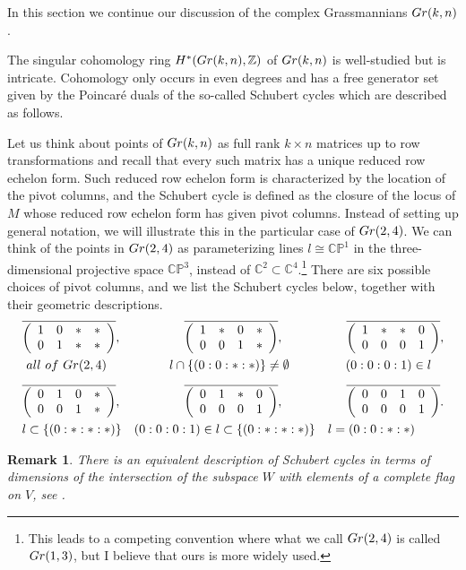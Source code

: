 \documentclass[11pt]{article}
\numberwithin{equation}{section}
\numberwithin{footnote}{section}
\newtheorem{rem}[thm]{Remark}
\newcommand{\Gr}{{\rm Gr}}
\renewcommand{\P}{{\mathbb P}}
\newcommand{\Z}{{\mathbb Z}}
\newcommand{\C}{{\mathbb C}}
\begin{document}
In this section we  continue our discussion of the complex Grassmannians $\Gr(k,n)$. 

\smallskip
The singular cohomology ring $H^*(\Gr(k,n),\Z)$ of $\Gr(k,n)$ is well-studied but is intricate. 
Cohomology only occurs in even degrees and has a free generator set given by the Poincar\'e duals of the so-called Schubert cycles which are described as follows.

\smallskip
Let us think about points of  $\Gr(k,n)$  as full rank $k\times n$ matrices up to row transformations and recall that every such matrix has a unique reduced row echelon form. Such reduced row echelon form is characterized by the location of the pivot columns, and the Schubert cycle is defined as the closure of the locus of $M$ whose reduced row echelon form has given pivot columns. Instead of setting up general notation, we will illustrate this in the particular case of $\Gr(2,4)$. We can think of the points in $\Gr(2,4)$ as parameterizing lines $l\cong\C\P^1$ in the three-dimensional projective space $\C\P^3$, instead of $\C^2\subset \C^4$.\footnote{ This leads to a competing convention where what we call $\Gr(2,4)$ is called $\Gr(1,3)$, but I believe that ours is more widely used.}
There are six possible choices of pivot columns, and we list the Schubert cycles below, together with their geometric descriptions. 
\begin{align}\label{sch}
&
\overline{\left(
\begin{array}{cccc}
1&0&*&*\\
0&1&*&*
\end{array}
\right)},
\hskip 50pt
\overline{\left(
\begin{array}{cccc}
1&*&0&*\\
0&0&1&*
\end{array}
\right)},
\hskip 50pt
\overline{\left(
\begin{array}{cccc}
1&*&*&0\\
0&0&0&1
\end{array}
\right)},
\notag\\
&
{\rm ~all~of~}\Gr(2,4)
\hskip 50pt
l\cap \{(0:0:*:*)\}\neq \emptyset
\hskip 45pt
(0:0:0:1)\in l
\notag
\\[.5em]
&
\overline{\left(
\begin{array}{cccc}
0&1&0&*\\
0&0&1&*
\end{array}
\right)},
\hskip 50pt
\overline{\left(
\begin{array}{cccc}
0&1&*&0\\
0&0&0&1
\end{array}
\right)},
\hskip 50pt
\overline{\left(
\begin{array}{cccc}
0&0&1&0\\
0&0&0&1
\end{array}
\right)}.
\notag\\
&
l\subset\{(0:*:*:*)\}
\hskip 10pt
(0:0:0:1)\in l\subset \{(0:*:*:*)\}
\hskip 10pt
l=(0:0:*:*)
\end{align}
\begin{rem}
There is an equivalent description of Schubert cycles in terms of dimensions of the intersection of the subspace $W$ with elements of a complete flag on $V$, see \cite{GH}.
\end{rem}
\end{document}
